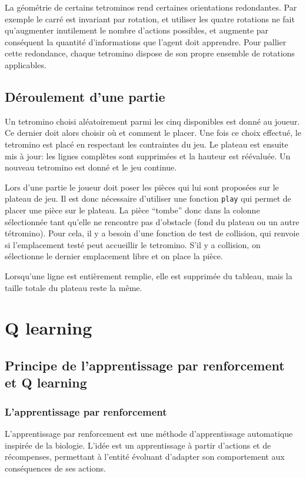 \documentclass{report}
\begin{document}
La géométrie de certains tetrominos rend certaines orientations redondantes. Par
exemple le carré est invariant par rotation, et utiliser les quatre rotations
ne fait qu'augmenter inutilement le nombre d'actions possibles, et augmente par
conséquent la quantité d'informations que l'agent doit apprendre. Pour pallier
cette redondance, chaque tetromino dispose de son propre ensemble de rotations
applicables.

\section{Déroulement d'une partie}
Un tetromino choisi aléatoirement parmi les cinq disponibles est donné au
joueur. Ce dernier doit alors choisir où et comment le placer. Une fois ce
choix effectué, le tetromino est placé en respectant les contraintes du jeu. Le
plateau est ensuite mis à jour: les lignes complètes sont supprimées et la
hauteur est réévaluée. Un nouveau tetromino est donné et le jeu continue.


Lors d'une partie le joueur doit poser les pièces qui lui sont proposées sur
le plateau de jeu. Il est donc nécessaire d'utiliser une fonction \texttt{play}
qui permet de placer une pièce sur le plateau. La pièce ``tombe'' donc dans la
colonne sélectionnée tant qu'elle ne rencontre pas d'obstacle (fond du plateau
ou un autre tétromino). Pour cela, il y a besoin d'une fonction de test de
collision, qui renvoie si l'emplacement testé peut accueillir le tetromino.
S'il y a collision, on sélectionne le dernier emplacement libre et on place la
pièce.

Lorsqu'une ligne est entièrement remplie, elle est supprimée du tableau, mais
la taille totale du plateau reste la même.


\chapter{Q learning}

\section{Principe de l'apprentissage par renforcement et Q learning}
\subsection{L'apprentissage par renforcement}

L'apprentissage par renforcement est une méthode d'apprentissage automatique
inspirée de la biologie. L'idée est un apprentissage à partir d'actions et
de récompenses, permettant à l'entité évoluant d'adapter son comportement aux
conséquences de ses actions.
\end{document}
